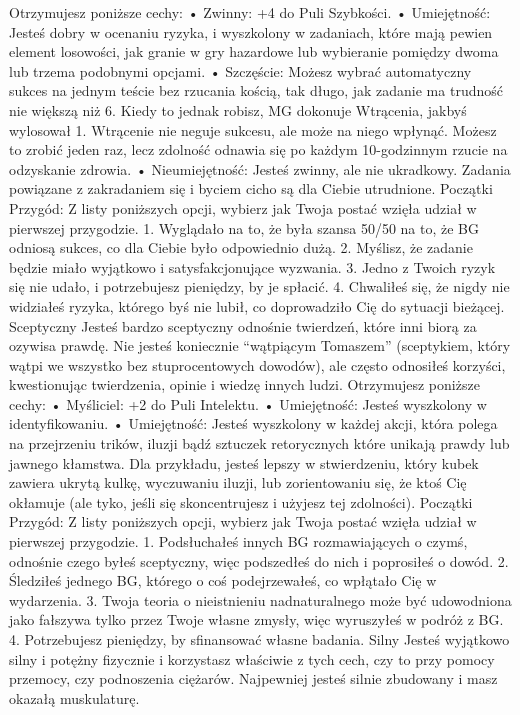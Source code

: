 Otrzymujesz poniższe cechy:
    • Zwinny: +4 do Puli Szybkości.
    • Umiejętność: Jesteś dobry w ocenaniu ryzyka, i wyszkolony w zadaniach, które mają pewien element losowości, jak granie w gry hazardowe lub wybieranie pomiędzy dwoma lub trzema podobnymi opcjami.
    • Szczęście: Możesz wybrać automatyczny sukces na jednym teście bez rzucania kością, tak długo, jak zadanie ma trudność nie większą niż 6. Kiedy to jednak robisz, MG dokonuje Wtrącenia, jakbyś wylosował 1. Wtrącenie nie neguje sukcesu, ale może na niego wpłynąć. Możesz to zrobić jeden raz, lecz zdolność odnawia się po każdym 10-godzinnym rzucie na odzyskanie zdrowia.
    • Nieumiejętność: Jesteś zwinny, ale nie ukradkowy. Zadania powiązane z zakradaniem się i byciem cicho są dla Ciebie utrudnione.
Początki Przygód: Z listy poniższych opcji, wybierz jak Twoja postać wzięła udział w pierwszej przygodzie.
1. Wyglądało na to, że była szansa 50/50 na to, że BG odniosą sukces, co dla Ciebie było odpowiednio dużą.
2. Myślisz, że zadanie będzie miało wyjątkowo i satysfakcjonujące wyzwania.
3. Jedno z Twoich ryzyk się nie udało, i potrzebujesz pieniędzy, by je spłacić.
4. Chwaliłeś się, że nigdy nie widziałeś ryzyka, którego byś nie lubił, co doprowadziło Cię do sytuacji bieżącej. 
Sceptyczny
Jesteś bardzo sceptyczny odnośnie twierdzeń, które inni biorą za ozywisa prawdę. Nie jesteś koniecznie “wątpiącym Tomaszem” (sceptykiem, który wątpi we wszystko bez stuprocentowych dowodów), ale często odnosiłeś korzyści, kwestionując twierdzenia, opinie i wiedzę innych ludzi.
Otrzymujesz poniższe cechy:
    • Myśliciel: +2 do Puli Intelektu.
    • Umiejętność: Jesteś wyszkolony w identyfikowaniu.
    • Umiejętność: Jesteś wyszkolony w każdej akcji, która polega na przejrzeniu trików, iluzji bądź sztuczek retorycznych które unikają prawdy lub jawnego kłamstwa. Dla przykładu, jesteś lepszy w stwierdzeniu, który kubek zawiera ukrytą kulkę, wyczuwaniu iluzji, lub zorientowaniu się, że ktoś Cię okłamuje (ale tyko, jeśli się skoncentrujesz i użyjesz tej zdolności).
Początki Przygód: Z listy poniższych opcji, wybierz jak Twoja postać wzięła udział w pierwszej przygodzie.
1. Podsłuchałeś innych BG rozmawiających o czymś, odnośnie czego byłeś sceptyczny, więc podszedłeś do nich i poprosiłeś o dowód.
2. Śledziłeś jednego BG, którego o coś podejrzewałeś, co wpłątało Cię w wydarzenia.
3. Twoja teoria o nieistnieniu nadnaturalnego może być udowodniona jako fałszywa tylko przez Twoje własne zmysły, więc wyruszyłeś w podróż z BG.
4. Potrzebujesz pieniędzy, by sfinansować własne badania.
Silny
Jesteś wyjątkowo silny i potężny fizycznie i korzystasz właściwie z tych cech, czy to przy pomocy przemocy, czy podnoszenia ciężarów. Najpewniej jesteś silnie zbudowany i masz okazałą muskulaturę.
